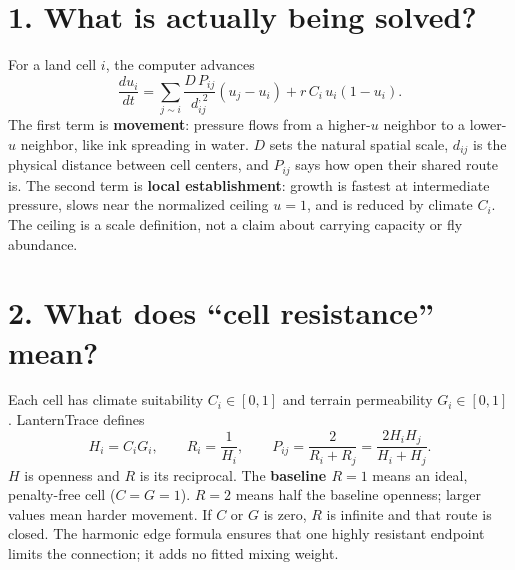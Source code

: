 \documentclass[10pt]{article}
\begin{document}
\section*{1. What is actually being solved?}
For a land cell $i$, the computer advances
\begin{equation}
\frac{du_i}{dt}=\sum_{j\sim i}\frac{D\,P_{ij}}{d_{ij}^{,2}}(u_j-u_i)
  + r\,C_i\,u_i(1-u_i).                                           \tag{1}
\end{equation}
The first term is \textbf{movement}: pressure flows from a higher-$u$ neighbor to a lower-$u$ neighbor, like ink spreading in water.  $D$ sets the natural spatial scale, $d_{ij}$ is the physical distance between cell centers, and $P_{ij}$ says how open their shared route is.  The second term is \textbf{local establishment}: growth is fastest at intermediate pressure, slows near the normalized ceiling $u=1$, and is reduced by climate $C_i$.  The ceiling is a scale definition, not a claim about carrying capacity or fly abundance.

\section*{2. What does ``cell resistance'' mean?}
Each cell has climate suitability $C_i\in[0,1]$ and terrain permeability $G_i\in[0,1]$.  LanternTrace defines
\begin{equation}
H_i=C_iG_i,\qquad R_i=\frac{1}{H_i},\qquad
P_{ij}=\frac{2}{R_i+R_j}=\frac{2H_iH_j}{H_i+H_j}.                  \tag{2}
\end{equation}
$H$ is openness and $R$ is its reciprocal.  The \textbf{baseline $R=1$} means an ideal, penalty-free cell ($C=G=1$).  $R=2$ means half the baseline openness; larger values mean harder movement.  If $C$ or $G$ is zero, $R$ is infinite and that route is closed.  The harmonic edge formula ensures that one highly resistant endpoint limits the connection; it adds no fitted mixing weight.

\begin{center}
\end{center}
\end{document}
